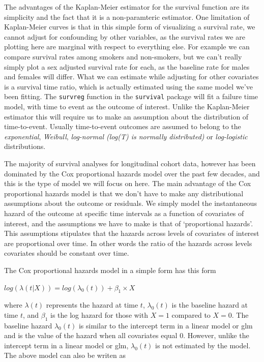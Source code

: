 \documentclass[
]{book}
\begin{document}
The advantages of the Kaplan-Meier estimator for the survival function are its simplicity and the fact that it is a non-paramteric estimator. One limitation of Kaplan-Meier curves is that in this simple form of visualizing a survival rate, we cannot adjust for confounding by other variables, as the survival rates we are plotting here are marginal with respect to everything else. For example we can compare survival rates among smokers and non-smokers, but we can't really simply plot a sex adjusted survival rate for each, as the baseline rate for males and females will differ. What we can estimate while adjusting for other covariates is a survival time ratio, which is actually estimated using the same model we've been fitting. The \texttt{survreg} function in the \texttt{survival} package will fit a failure time model, with time to event as the outcome of interest. Unlike the Kaplan-Meier estimator this will require us to make an assumption about the distribution of time-to-event. Usually time-to-event outcomes are assumed to belong to the \emph{exponential}, \emph{Weibull}, \emph{log-normal (log(T) is normally distributed)} or \emph{log-logistic} distributions.

The majority of survival analyses for longitudinal cohort data, however has been dominated by the Cox proportional hazards model over the past few decades, and this is the type of model we will focus on here. The main advantage of the Cox proportional hazards model is that we don't have to make any distributional assumptions about the outcome or residuals. We simply model the instantaneous hazard of the outcome at specific time intervals as a function of covariates of interest, and the assumptions we have to make is that of `proportional hazards'. This assumptions stipulates that the hazards across levels of covariates of interest are proportional over time. In other words the ratio of the hazards across levels covariates should be constant over time.

The Cox proportional hazards model in a simple form has this form

\(log(\lambda(t|X))=log(\lambda_{0}(t))+\beta_{1}\times X\)

where \(\lambda(t)\) represents the hazard at time \(t\), \(\lambda_{0}(t)\) is the baseline hazard at time \(t\), and \(\beta_{1}\) is the log hazard for those with \(X=1\) compared to \(X=0\). The baseline hazard \(\lambda_{0}(t)\) is similar to the intercept term in a linear model or glm and is the value of the hazard when all covariates equal 0. However, unlike the intercept term in a linear model or glm, \(\lambda_{0}(t)\) is not estimated by the model.
The above model can also be writen as
\end{document}
